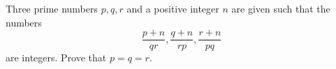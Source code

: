 Three prime numbers $p,q,r$ and a positive integer $n$ are given such that the numbers\[ \frac{p+n}{qr}, \frac{q+n}{rp}, \frac{r+n}{pq} \]are integers. Prove that $p=q=r $.